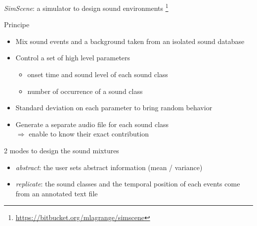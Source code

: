 \documentclass{beamer}
\begin{document}
\begin{frame}{\textit{SimScene}: a simulator to design sound environments \footnote{\url{https://bitbucket.org/mlagrange/simscene}}}
\begin{block}{Principe}
\begin{itemize}
	\item Mix sound events and a background taken from an isolated sound database
	\item Control a set of high level parameters
	\begin{itemize}
		\item onset time and sound level of each sound class
		\item number of occurrence of a sound class
	\end{itemize}
	\item Standard deviation on each parameter to bring random behavior
	\item Generate a separate audio file for each sound class \\
	$\Rightarrow$ enable to know their exact contribution

\end{itemize}
\end{block}

\begin{block}{2 modes to design the sound mixtures}
\begin{itemize}
	\item \textit{abstract}: the user sets abstract information (mean / variance)
	\item \textit{replicate}: the sound classes and the temporal position of each events come from an annotated text file
\end{itemize}
\end{block}

\end{frame}

\end{document}

